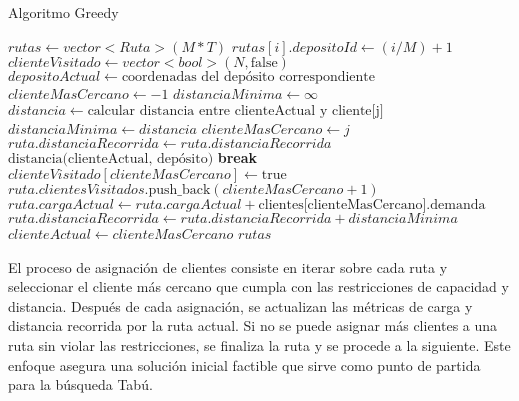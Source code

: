 \documentclass[letter, 10pt]{article}
\begin{document}
\begin{algorithm}[H]
\caption{Algoritmo Greedy}
\begin{algorithmic}[1]
        \State $rutas \gets vector<Ruta>(M * T)$
            \State $rutas[i].depositoId \gets (i / M) + 1$
        \EndFor
        \State $clienteVisitado \gets vector<bool>(N, \text{false})$
            \State $depositoActual \gets \text{coordenadas del depósito correspondiente}$
                \State $clienteMasCercano \gets -1$
                \State $distanciaMinima \gets \infty$
                        \State $distancia \gets \text{calcular distancia entre clienteActual y cliente[j]}$
                            \State $distanciaMinima \gets distancia$
                            \State $clienteMasCercano \gets j$
                        \EndIf
                    \EndIf
                \EndFor
                        \State $ruta.distanciaRecorrida \gets ruta.distanciaRecorrida$ \text{+}\\
                        \hspace*{3cm}$\text{distancia(clienteActual, depósito)}$
                    \EndIf
                    \State \textbf{break}
                \EndIf
                \State $clienteVisitado[clienteMasCercano] \gets \text{true}$
                \State $ruta.clientesVisitados.\text{push\_back}(clienteMasCercano + 1)$
                \State $ruta.cargaActual \gets ruta.cargaActual + \text{clientes[clienteMasCercano].demanda}$
                \State $ruta.distanciaRecorrida \gets ruta.distanciaRecorrida + distanciaMinima$
                \State $clienteActual \gets clienteMasCercano$
            \EndWhile
        \EndFor
        \State \Return $rutas$
    \EndFunction
\end{algorithmic}
\end{algorithm}

El proceso de asignación de clientes consiste en iterar sobre cada ruta y seleccionar el cliente más cercano que cumpla con las restricciones de capacidad y distancia. Después de cada asignación, se actualizan las métricas de carga y distancia recorrida por la ruta actual. Si no se puede asignar más clientes a una ruta sin violar las restricciones, se finaliza la ruta y se procede a la siguiente. Este enfoque asegura una solución inicial factible que sirve como punto de partida para la búsqueda Tabú.
\end{document}
